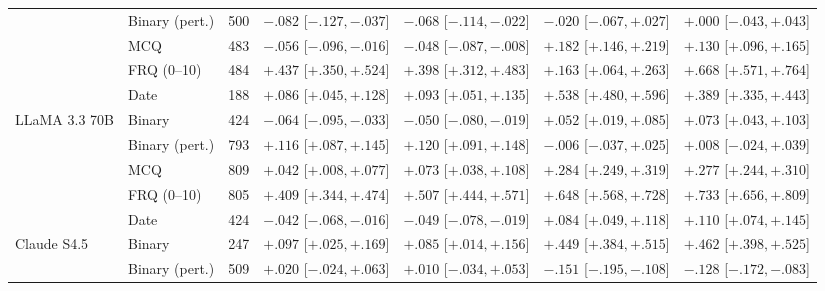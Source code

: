 \begin{table}[p]
\begin{tabular}{l l r c c c c}
& Binary (pert.)
& 500
& $-.082$ {\tiny[$-.127,-.037$]}
& $-.068$ {\tiny[$-.114,-.022$]}
& $-.020$ {\tiny[$-.067,+.027$]}
& $+.000$ {\tiny[$-.043,+.043$]} \\


& MCQ
& 483
& $-.056$ {\tiny[$-.096,-.016$]}
& $-.048$ {\tiny[$-.087,-.008$]}
& $+.182$ {\tiny[$+.146,+.219$]}
& $+.130$ {\tiny[$+.096,+.165$]} \\


& FRQ (0--10)
& 484
& $+.437$ {\tiny[$+.350,+.524$]}
& $+.398$ {\tiny[$+.312,+.483$]}
& $+.163$ {\tiny[$+.064,+.263$]}
& $+.668$ {\tiny[$+.571,+.764$]} \\


& Date
& 188
& $+.086$ {\tiny[$+.045,+.128$]}
& $+.093$ {\tiny[$+.051,+.135$]}
& $+.538$ {\tiny[$+.480,+.596$]}
& $+.389$ {\tiny[$+.335,+.443$]} \\

\addlinespace

LLaMA 3.3 70B
& Binary
& 424
& $-.064$ {\tiny[$-.095,-.033$]}
& $-.050$ {\tiny[$-.080,-.019$]}
& $+.052$ {\tiny[$+.019,+.085$]}
& $+.073$ {\tiny[$+.043,+.103$]} \\


& Binary (pert.)
& 793
& $+.116$ {\tiny[$+.087,+.145$]}
& $+.120$ {\tiny[$+.091,+.148$]}
& $-.006$ {\tiny[$-.037,+.025$]}
& $+.008$ {\tiny[$-.024,+.039$]} \\


& MCQ
& 809
& $+.042$ {\tiny[$+.008,+.077$]}
& $+.073$ {\tiny[$+.038,+.108$]}
& $+.284$ {\tiny[$+.249,+.319$]}
& $+.277$ {\tiny[$+.244,+.310$]} \\


& FRQ (0--10)
& 805
& $+.409$ {\tiny[$+.344,+.474$]}
& $+.507$ {\tiny[$+.444,+.571$]}
& $+.648$ {\tiny[$+.568,+.728$]}
& $+.733$ {\tiny[$+.656,+.809$]} \\


& Date
& 424
& $-.042$ {\tiny[$-.068,-.016$]}
& $-.049$ {\tiny[$-.078,-.019$]}
& $+.084$ {\tiny[$+.049,+.118$]}
& $+.110$ {\tiny[$+.074,+.145$]} \\

\addlinespace

Claude S4.5
& Binary
& 247
& $+.097$ {\tiny[$+.025,+.169$]}
& $+.085$ {\tiny[$+.014,+.156$]}
& $+.449$ {\tiny[$+.384,+.515$]}
& $+.462$ {\tiny[$+.398,+.525$]} \\


& Binary (pert.)
& 509
& $+.020$ {\tiny[$-.024,+.063$]}
& $+.010$ {\tiny[$-.034,+.053$]}
& $-.151$ {\tiny[$-.195,-.108$]}
& $-.128$ {\tiny[$-.172,-.083$]} \\



\end{tabular}
\end{table}
